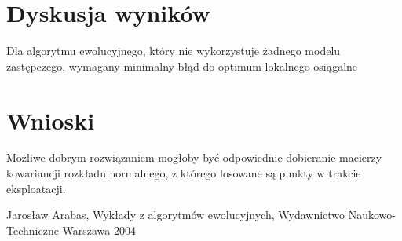 \documentclass[runningheads]{llncs}
\begin{document}
\section{Dyskusja wyników}

Dla algorytmu ewolucyjnego, który nie wykorzystuje żadnego modelu zastępczego, 
wymagany minimalny błąd do optimum lokalnego osiągalne 
\section{Wnioski}

Możliwe dobrym rozwiązaniem mogłoby być odpowiednie dobieranie macierzy 
kowariancji rozkładu normalnego, z którego losowane są punkty w trakcie 
eksploatacji.
\begin{thebibliography}{5}
Jarosław Arabas, Wykłady z algorytmów ewolucyjnych, Wydawnictwo 
Naukowo-Techniczne Warszawa 2004 
\end{thebibliography}
\end{document}
